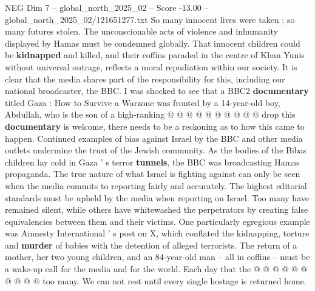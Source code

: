 \begin{textsample}{NEG Dim 7 – global\_north\_2025\_02 – Score -13.00 – global\_north\_2025\_02/121651277.txt}
So many innocent lives were taken ; so many futures stolen.
The unconscionable acts of violence and inhumanity displayed by Hamas must be condemned globally.
That innocent children could be \textbf{kidnapped} and killed, and their coffins paraded in the centre of Khan Yunis without universal outrage, reflects a moral repudiation within our society.
It is clear that the media shares part of the responsibility for this, including our national broadcaster, the BBC.
I was shocked to see that a BBC2 \textbf{documentary} titled Gaza : How to Survive a Warzone was fronted by a 14-year-old boy, Abdullah, who is the son of a high-ranking @ @ @ @ @ @ @ @ @ @ drop this \textbf{documentary} is welcome, there needs to be a reckoning as to how this came to happen.
Continued examples of bias against Israel by the BBC and other media outlets undermine the trust of the Jewish community.
As the bodies of the Bibas children lay cold in Gaza ' s terror \textbf{tunnels}, the BBC was broadcasting Hamas propaganda.
The true nature of what Israel is fighting against can only be seen when the media commits to reporting fairly and accurately.
The highest editorial standards must be upheld by the media when reporting on Israel.
Too many have remained silent, while others have whitewashed the perpetrators by creating false equivalencies between them and their victims.
One particularly egregious example was Amnesty International ' s post on X, which conflated the kidnapping, torture and \textbf{murder} of babies with the detention of alleged terrorists.
The return of a mother, her two young children, and an 84-year-old man -- all in coffins -- must be a wake-up call for the media and for the world.
Each day that the @ @ @ @ @ @ @ @ @ @ too many.
We can not rest until every single hostage is returned home.

\end{textsample}
